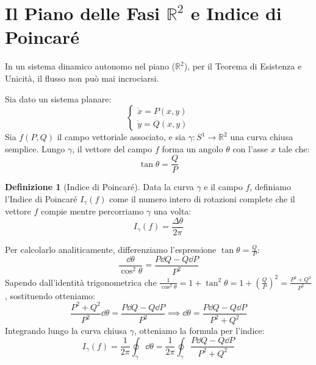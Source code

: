 \documentclass[openany]{book}
\theoremstyle{definition}
\newtheorem*{definizione}{Definizione}
\theoremstyle{remark}
\newcommand{\R}{\mathbb{R}}
\begin{document}
\section{Il Piano delle Fasi $\R^2$ e Indice di Poincaré}

In un sistema dinamico autonomo nel piano ($\R^2$), per il Teorema di Esistenza e Unicità, il flusso non può mai incrociarsi. 

Sia dato un sistema planare:
\[
\begin{cases}
\dot{x} = P(x,y) \\
\dot{y} = Q(x,y)
\end{cases}
\]
Sia $f(P,Q)$ il campo vettoriale associato, e sia $\gamma : S^1 \to \R^2$ una curva chiusa semplice.
Lungo $\gamma$, il vettore del campo $f$ forma un angolo $\theta$ con l'asse $x$ tale che:
\[
\tan \theta = \frac{Q}{P}
\]

\begin{center}
\end{center}

\begin{definizione}[Indice di Poincaré]
Data la curva $\gamma$ e il campo $f$, definiamo l'Indice di Poincaré $I_\gamma(f)$ come il numero intero di rotazioni complete che il vettore $f$ compie mentre percorriamo $\gamma$ una volta:
\[
I_\gamma(f) = \frac{\Delta \theta}{2\pi}
\]
\end{definizione}

Per calcolarlo analiticamente, differenziamo l'espressione $\tan \theta = \frac{Q}{P}$:
\[
\frac{\dd\theta}{\cos^2 \theta} = \frac{P \dd Q - Q \dd P}{P^2}
\]
Sapendo dall'identità trigonometrica che $\frac{1}{\cos^2 \theta} = 1 + \tan^2 \theta = 1 + \left(\frac{Q}{P}\right)^2 = \frac{P^2 + Q^2}{P^2}$, sostituendo otteniamo:
\[
\frac{P^2 + Q^2}{P^2} \dd\theta = \frac{P \dd Q - Q \dd P}{P^2} \implies \dd\theta = \frac{P \dd Q - Q \dd P}{P^2 + Q^2}
\]
Integrando lungo la curva chiusa $\gamma$, otteniamo la formula per l'indice:
\begin{equation}
I_\gamma(f) = \frac{1}{2\pi} \oint_\gamma \dd\theta = \frac{1}{2\pi} \oint_\gamma \frac{P \dd Q - Q \dd P}{P^2 + Q^2}
\end{equation}
\end{document}
